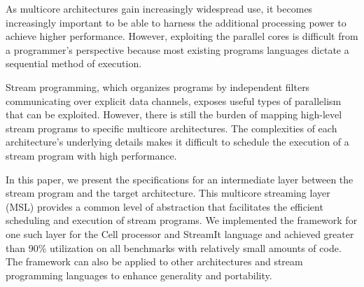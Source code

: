 %
%
%
%
% 
% 
%

As multicore architectures gain increasingly widespread use, it becomes increasingly important to be able to harness the
additional processing power to achieve higher performance. However, exploiting the parallel cores is difficult from a
programmer's perspective because most existing programs languages dictate a sequential method of execution.

Stream programming, which organizes programs by independent filters communicating over explicit data channels, 
exposes useful types of parallelism that can be exploited. However, there is still the burden of mapping high-level stream programs to
specific multicore architectures. The complexities of each architecture's underlying details makes it difficult to
schedule the execution of a stream program with high performance.

In this paper, we present the specifications for an intermediate layer between the stream program and the target architecture.
This multicore streaming layer (MSL) provides a common level of abstraction that facilitates the efficient scheduling and
execution of stream programs. We implemented the framework for one such layer for the Cell processor and StreamIt language
and achieved greater than
90\% utilization on all benchmarks with relatively small amounts of code. The framework can also be applied to other
architectures and stream programming languages to enhance generality and portability.




